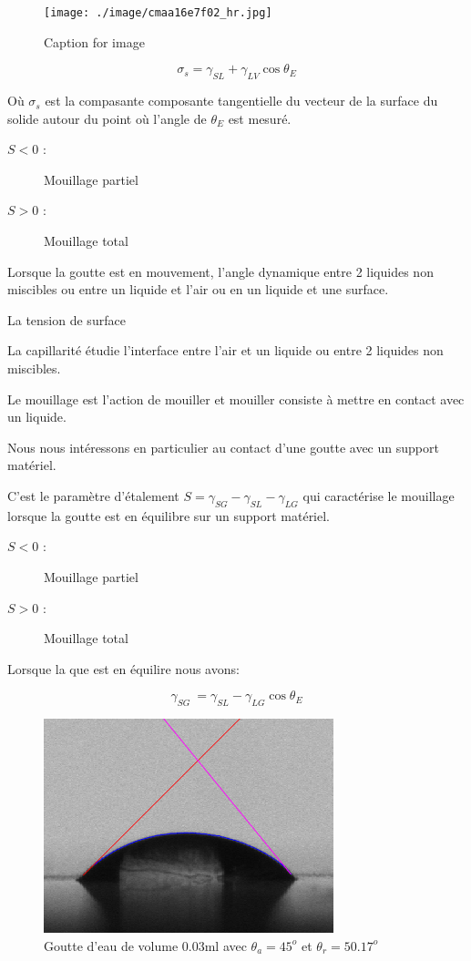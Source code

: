 \documentclass[french]{article}
\begin{document}
\newpage
\begin{figure}
\centering
\begin{minipage}[c]{\textwidth}
\centering
	\texttt{[image: ./image/cmaa16e7f02\_hr.jpg]}
    \caption{Caption for image}
    \label{fig:sample_figure}
\end{minipage}
\end{figure}
\begin{equation}
	\label{eq:Young-revisted}
	\sigma_{s}  = \gamma_{SL} + \gamma_{LV}\cos\theta_{E}
\end{equation}

Où $\sigma_{s}$ est la compasante composante tangentielle du vecteur de la surface du solide autour du point où l'angle de $\theta_{E}$ est mesuré.
\begin{description}
\item[$S < 0$ :] Mouillage partiel
\item[$S > 0$ :] Mouillage total
\end{description}


Lorsque la goutte est en mouvement, l'angle dynamique   entre 2 liquides non miscibles ou entre un liquide et l'air ou en un liquide et une surface.

La tension de surface 

La capillarité étudie l'interface entre l'air et un liquide ou entre 2 liquides
non miscibles.

Le mouillage est l'action de mouiller et mouiller consiste à mettre en contact avec un liquide.

Nous nous intéressons en particulier au contact d'une goutte avec un support matériel.

C'est le paramètre d'étalement $S = \gamma_{SG} - \gamma_{SL} - \gamma_{LG}$ qui caractérise le mouillage lorsque la goutte est en équilibre sur un support matériel.

\begin{description}
\item[$S < 0$ :] Mouillage partiel
\item[$S > 0$ :] Mouillage total
\end{description}

Lorsque la que est en équilire nous avons:

\[\gamma_{SG}\ = \gamma_{SL} - \gamma_{LG}\cos\theta_{E} \]

\begin{figure}[ht]
	\centering
	\includegraphics[scale = 0.6]{./image/crop_tvitesse=28_volume=003.png}
	\caption{Goutte d'eau de volume $0.03$ml avec $\theta_{a} = 45^{o}$ et $\theta_{r} = 50.17^{o}$}
\end{figure}
\end{document}

